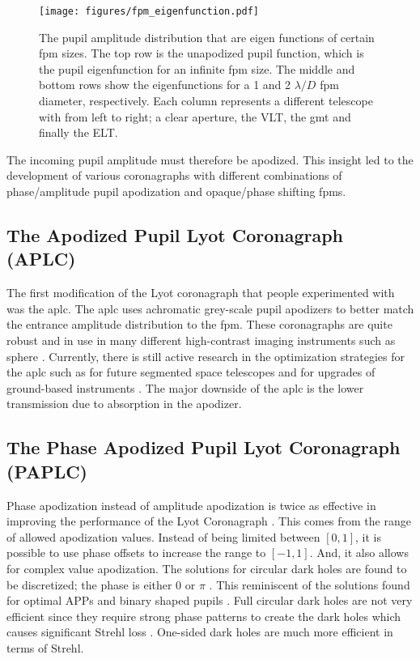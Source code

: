 \documentclass[letterpaper]{ar-1col}
\newcommand{\ld}{$\lambda/D$}
\begin{document}
\begin{figure}[ht]
  \centering
  \texttt{[image: figures/fpm\_eigenfunction.pdf]}
  \caption{The pupil amplitude distribution that are eigen functions of certain \ac{fpm} sizes. The top row is the unapodized pupil function, which is the pupil eigenfunction for an infinite \ac{fpm} size. The middle and bottom rows show the eigenfunctions for a 1 and 2 \ld{} \ac{fpm} diameter, respectively. Each column represents a different telescope with from left to right; a clear aperture, the VLT, the \ac{gmt} and finally the ELT.}
  \label{fig:fpm_eigenfunctions}
\end{figure}

The incoming pupil amplitude must therefore be apodized. This insight led to the development of various coronagraphs with different combinations of phase/amplitude pupil apodization and opaque/phase shifting \acp{fpm}.

\subsection{The Apodized Pupil Lyot Coronagraph (APLC)}
The first modification of the Lyot coronagraph that people experimented with was the \ac{aplc}. The \ac{aplc} uses achromatic grey-scale pupil apodizers to better match the entrance amplitude distribution to the \ac{fpm}. These coronagraphs are quite robust and in use in many different high-contrast imaging instruments such as \ac{sphere} \citep{beuzit2019sphere}. Currently, there is still active research in the optimization strategies for the \ac{aplc} such as for future segmented space telescopes \citep{zimmerman2016lyot} and for upgrades of ground-based instruments \citep{nickson2022aplc}. The major downside of the \ac{aplc} is the lower transmission due to absorption in the apodizer.


\subsection{The Phase Apodized Pupil Lyot Coronagraph (PAPLC)}
\label{sec:paplc}
Phase apodization instead of amplitude apodization is twice as effective in improving the performance of the Lyot Coronagraph \citep{Por20}. This comes from the range of allowed apodization values. Instead of being limited between $[0, 1]$, it is possible to use phase offsets to increase the range to $[-1, 1]$. And, it also allows for complex value apodization. The solutions for circular dark holes are found to be discretized; the phase is either 0 or $\pi$ \citep{Por20}. This reminiscent of the solutions found for optimal APPs \citep{Por17} and binary shaped pupils \citep{Carlotti11}. Full circular dark holes are not very efficient since they require strong phase patterns to create the dark holes which causes significant Strehl loss \citep{Por17}. One-sided dark holes are much more efficient in terms of Strehl. 
\end{document}
